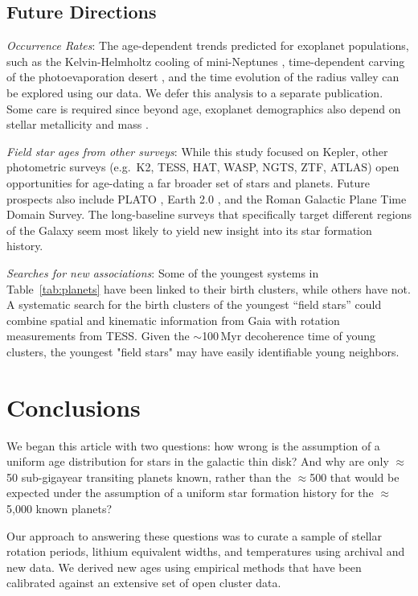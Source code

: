 \documentclass[11pt,twocolumn,tighten]{aastex63}
\begin{document}
\subsection{Future Directions}

{\it Occurrence Rates}:
The age-dependent trends predicted for exoplanet populations, such as
the Kelvin-Helmholtz cooling of mini-Neptunes \citep{Gupta_2019},
time-dependent carving of the photoevaporation desert
\citep{Owen_Lai_2018}, and the time evolution of the radius valley
\citep{Rogers_2021} can be explored using our data.  We defer this
analysis to a separate publication.
Some care is required since beyond age,
exoplanet demographics also depend on stellar metallicity and mass
\citep[e.g.][]{Petigura_2018}.  

{\it Field star ages from other surveys}:
While this study focused on
Kepler, other photometric surveys (e.g.~K2, TESS, HAT, WASP, NGTS, ZTF,
ATLAS) open opportunities for age-dating a far broader set
of stars and planets.
Future prospects also include PLATO
\citep{Rauer14}, Earth 2.0 \citep{2022arXiv220606693G}, and the Roman
Galactic Plane Time Domain Survey.
The long-baseline surveys 
that specifically target different regions of the Galaxy
seem most likely to yield new insight into its star
formation history.

{\it Searches for new associations}:
Some of the youngest systems in Table~\ref{tab:planets} have been
linked to their birth clusters, while others have not. A systematic
search for the birth clusters of the youngest ``field stars'' could
combine spatial and kinematic information from Gaia with rotation
measurements from TESS. Given the $\sim$100\,Myr decoherence time of
young clusters, the youngest "field stars" may have easily
identifiable young neighbors.



\section{Conclusions}
\label{sec:conclusions}

We began this article with two questions: how wrong is the assumption
of a uniform age distribution for stars in the galactic thin disk?
And why are only $\approx$50 sub-gigayear transiting planets known,
rather than the $\approx$500 that would be expected under the
assumption of a uniform star formation history for the
$\approx$5{,}000 known planets?

Our approach to answering these questions was to curate a sample of
stellar rotation periods, lithium equivalent widths, and temperatures
using archival and new data.  We derived new ages using empirical
methods that have been calibrated against an extensive set of open
cluster data.
\end{document}
